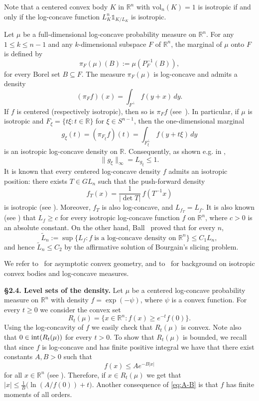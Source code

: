 \documentclass[11pt,leqno]{article}
\theoremstyle{definition}
\theoremstyle{remark}
\numberwithin{equation}{section}
\newcommand{\ls}{\leqslant}
\newcommand{\gr}{\geqslant}
\newcommand{\1}{\textbf{1}}
\newcommand{\vol}{\mathrm{vol}}
\begin{document}
Note that a centered convex body $K$ in $\mathbb{R}^n$ with $\vol_n(K)=1$ is isotropic if and only if the log-concave function $L_K^n\mathds{1}_{K/L_K}$ is isotropic.

Let $\mu$ be a full-dimensional log-concave probability measure on $\mathbb{R}^n$.
For any $1\ls k \ls n-1$ and any $k$-dimensional subspace $F$ of $\mathbb{R}^n$, the marginal of $\mu$ onto $F$ is defined by
$$\pi_F(\mu)(B):=\mu(P_F^{-1}(B)),$$
for every Borel set $B\subseteq F$. The measure $\pi_F(\mu)$ is log-concave and admits a density
$$(\pi_F f)(x)=\int_{F^\perp} f(y+x)\,dy.$$
If $f$ is centered (respectively isotropic), then so is $\pi_F f$
(see~\cite[Proposition~5.1.11]{BGVV-book}). In particular, if $\mu$ is isotropic and $F_{\xi}=\{t\xi:t\in\mathbb{R}\}$ for $\xi\in S^{n-1}$, 
then the one-dimensional marginal $$g_{\xi}(t)=(\pi_{F_{\xi}}f)(t)=\int_{F_{\xi}^{\perp}}f(y+t\xi)\,dy$$
is an isotropic log-concave density on $\mathbb{R}$. Consequently, as shown e.g. in \cite{Fradelizi-1997},
\begin{equation}\label{eq:dim-1}\|g_{\xi}\|_{\infty}=L_{g_{\xi}}\ls 1.\end{equation}
It is known that every centered log-concave density $f$ admits an isotropic position: there exists $T\in GL_n$ such that the push-forward density
$$f_T(x)=\frac{1}{|\det T|}\,f(T^{-1}x)$$
is isotropic (see \cite[Section~2.3]{BGVV-book}).
Moreover, $f_T$ is also log-concave, and $L_{f_T}=L_f$. It is also known (see \cite[Proposition~2.3.12]{BGVV-book}) that $L_f\gr c$ for every
isotropic log-concave function $f$ on $\mathbb{R}^n$, where $c>0$ is an absolute constant. On the other hand, Ball~\cite{Ball-1988} proved that for every $n$,
$$\tilde{L}_n:=\sup\big\{L_f: f\;\text{is a log-concave density on $\mathbb{R}^n$}\big\}\ls C_1L_n,$$
and hence $\tilde{L}_n\ls C_2$ by the affirmative solution of Bourgain's slicing problem. 

We refer to~\cite{AGA-book,AGA-book-2} for asymptotic convex geometry, and to~\cite{BGVV-book} for background 
on isotropic convex bodies and log-concave measures.

\bigskip 

\noindent \textbf{\S 2.4. Level sets of the density.} Let $\mu$ be a centered log-concave probability measure on $\mathbb{R}^n$ with density 
$f=\exp(-\psi)$, where $\psi$ is a convex function. For every $t\gr 0$ we consider the convex set
$$R_t(\mu )=\{x\in {\mathbb R}^n:f(x)\gr e^{-t}f(0)\}.$$
Using the log-concavity of $f$ we easily check that $R_t(\mu )$ is convex. Note also that $0\in {\rm int}(R_t(\mu ))$ for every $t>0$.
To show that $R_t(\mu)$ is bounded, we recall that since $f$ is log-concave and has finite positive integral we
have that there exist constants $A,B>0$ such that
\begin{equation}\label{eq:A-B}f(x)\ls Ae^{-B|x|}\end{equation}
for all $x\in {\mathbb R}^n$ (see \cite[Lemma~2.2.1]{BGVV-book}). Therefore, if $x\in R_t(\mu)$ we get
that $|x|\ls\frac{1}{B}\big(\ln (A/f(0))+t\big)$. Another consequence of \eqref{eq:A-B} is that $f$ has
finite moments of all orders.
\end{document}
